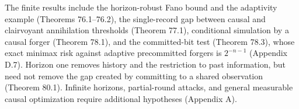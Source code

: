 
The finite results include the horizon-robust Fano bound and the adaptivity example (Theorems 76.1--76.2), the single-record gap between causal and clairvoyant annihilation thresholds (Theorem 77.1), conditional simulation by a causal forger (Theorem 78.1), and the committed-bit test (Theorem 78.3), whose exact minimax risk against adaptive precommitted forgers is \(2^{-n-1}\) (Appendix D.7). Horizon one removes history and the restriction to past information, but need not remove the gap created by committing to a shared observation (Theorem 80.1). Infinite horizons, partial-round attacks, and general measurable causal optimization require additional hypotheses (Appendix A).
